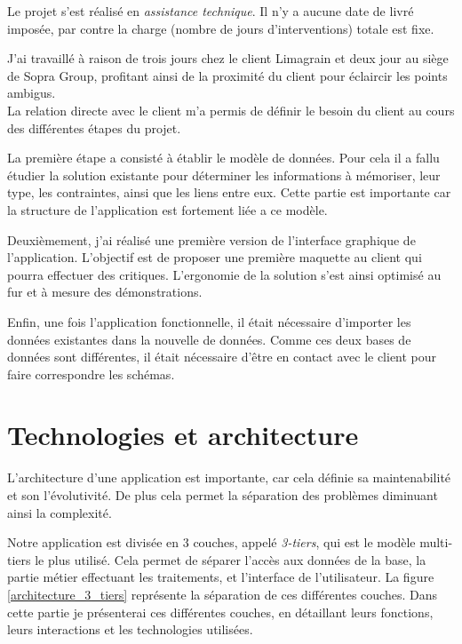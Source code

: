Le projet s'est réalisé en \textit{assistance technique}. Il n'y a aucune date de livré imposée, par contre la charge (nombre de jours d'interventions) totale est fixe.

J'ai travaillé à raison de trois jours chez le client Limagrain et deux jour au siège de Sopra Group, profitant ainsi de la proximité du client pour éclaircir les points ambigus.
\\

La relation directe avec le client m'a permis de définir le besoin du client au cours des différentes étapes du projet.

La première étape a consisté à établir le modèle de données. Pour cela il a fallu étudier la solution existante pour déterminer les informations à mémoriser, leur type, les contraintes, ainsi que les liens entre eux. Cette partie est importante car la structure de l'application est fortement liée a ce modèle.

Deuxièmement, j'ai réalisé une première version de l'interface graphique de l'application. L'objectif est de proposer une première maquette au client qui pourra effectuer des critiques. L'ergonomie de la solution s'est ainsi optimisé au fur et à mesure des démonstrations.

Enfin, une fois l'application fonctionnelle, il était nécessaire d'importer les données existantes dans la nouvelle de données. Comme ces deux bases de données sont différentes, il était nécessaire d'être en contact avec le client pour faire correspondre les schémas.


\section{Technologies et architecture}

L'architecture d'une application est importante, car cela définie sa maintenabilité et son l'évolutivité. De plus cela permet la séparation des problèmes diminuant ainsi la complexité.

Notre application est divisée en 3 couches, appelé \textit{3-tiers}, qui est le modèle multi-tiers le plus utilisé. Cela permet de séparer l'accès aux données de la base, la partie métier effectuant les traitements, et l'interface de l'utilisateur. La figure \ref{architecture_3_tiers} représente la séparation de ces différentes couches. Dans cette partie je présenterai ces différentes couches, en détaillant leurs fonctions, leurs interactions et les technologies utilisées.
~~\\

